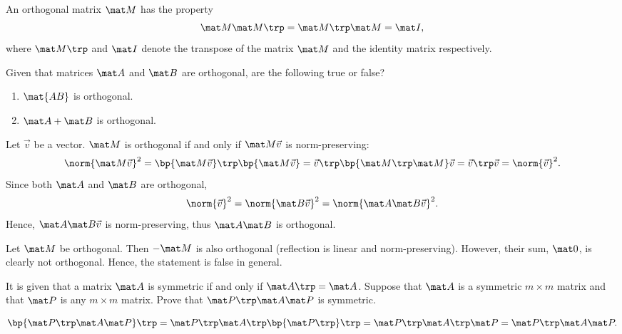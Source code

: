 \begin{problem}
    An orthogonal matrix $\mat M$ has the property \[\mat M \mat M \trp = \mat M \trp \mat M = \mat I,\] where $\mat M \trp$ and $\mat I$ denote the transpose of the matrix $\mat M$ and the identity matrix respectively.

    Given that matrices $\mat A$ and $\mat B$ are orthogonal, are the following true or false?
    \begin{enumerate}
        \item $\mat{AB}$ is orthogonal.
        \item $\mat A + \mat B$ is orthogonal.
    \end{enumerate}
\end{problem}
\begin{solution}
    \begin{ppart}
        Let $\vec v$ be a vector. $\mat M$ is orthogonal if and only if $\mat M \vec v$ is norm-preserving: \[\norm{\mat M \vec v}^2 = \bp{\mat M \vec v}\trp \bp{\mat M \vec v} = \vec v \trp \bp{\mat M \trp \mat M} \vec v = \vec v \trp \vec v = \norm{\vec v}^2.\] Since both $\mat A$ and $\mat B$ are orthogonal, \[\norm{\vec v}^2 = \norm{\mat B \vec v}^2 = \norm{\mat A \mat B \vec v}^2.\] Hence, $\mat A \mat B \vec v$ is norm-preserving, thus $\mat A \mat B$ is orthogonal.
    \end{ppart}
    \begin{ppart}
        Let $\mat M$ be orthogonal. Then $-\mat M$ is also orthogonal (reflection is linear and norm-preserving). However, their sum, $\mat 0$, is clearly not orthogonal. Hence, the statement is false in general.
    \end{ppart}
\end{solution}

\begin{problem}
    It is given that a matrix $\mat A$ is symmetric if and only if $\mat A \trp = \mat A$. Suppose that $\mat A$ is a symmetric $m \times m$ matrix and that $\mat P$ is any $m \times m$ matrix. Prove that $\mat P \trp \mat A \mat P$ is symmetric.
\end{problem}
\begin{solution}
    \[\bp{\mat P \trp \mat A \mat P}\trp = \mat P \trp \mat A \trp \bp{\mat P \trp}\trp = \mat P \trp \mat A \trp \mat P = \mat P \trp \mat A \mat P.\]
\end{solution}

